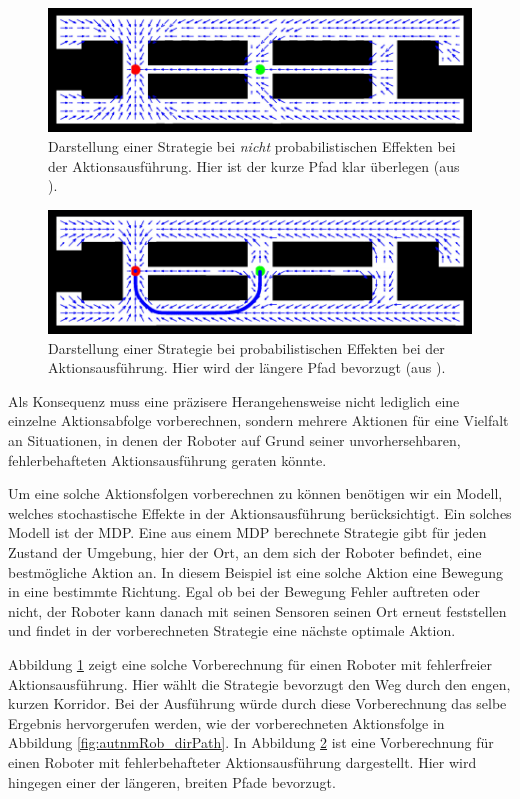 \documentclass[a4paper]{IEEEtran}
\begin{document}
\begin{figure}[ht]
	\centering
	\includegraphics[scale=0.72]{images/autnmRobot_detActionMDP.png}
	\caption{Darstellung einer Strategie bei \emph{nicht} probabilistischen Effekten bei der Aktionsausführung. Hier ist der kurze Pfad klar überlegen (aus \cite{thrun2005probabilistic}).}
	\label{autnmRobot_detA}
\end{figure}
\begin{figure}
	\includegraphics[scale=0.72]{images/autnmRobot_ndetActionMDP.png}
	\caption{Darstellung einer Strategie bei probabilistischen Effekten bei der Aktionsausführung. Hier wird der längere Pfad bevorzugt (aus \cite{thrun2005probabilistic}).}
	\label{autnmRobot_ndetA}
\end{figure}

Als Konsequenz muss eine präzisere Herangehensweise nicht lediglich eine einzelne Aktionsabfolge vorberechnen, sondern mehrere Aktionen für eine Vielfalt an Situationen, in denen der Roboter auf Grund seiner unvorhersehbaren, fehlerbehafteten Aktionsausführung geraten könnte.

Um eine solche Aktionsfolgen vorberechnen zu können benötigen wir ein Modell, welches stochastische Effekte in der Aktionsausführung berücksichtigt. Ein solches Modell ist der MDP. Eine aus einem MDP berechnete Strategie gibt für jeden Zustand der Umgebung, hier der Ort, an dem sich der Roboter befindet, eine bestmögliche Aktion an. In diesem Beispiel ist eine solche Aktion eine Bewegung in eine bestimmte Richtung. Egal ob bei der Bewegung Fehler auftreten oder nicht, der Roboter kann danach mit seinen Sensoren seinen Ort erneut feststellen und findet in der vorberechneten Strategie eine nächste optimale Aktion.

Abbildung \ref{autnmRobot_detA} zeigt eine solche Vorberechnung für einen Roboter mit fehlerfreier Aktionsausführung. Hier wählt die Strategie bevorzugt den Weg durch den engen, kurzen Korridor. Bei der Ausführung würde durch diese Vorberechnung das selbe Ergebnis hervorgerufen werden, wie der vorberechneten Aktionsfolge in Abbildung \ref{fig:autnmRob_dirPath}. In Abbildung \ref{autnmRobot_ndetA} ist eine Vorberechnung für einen Roboter mit fehlerbehafteter Aktionsausführung dargestellt. Hier wird hingegen einer der längeren, breiten Pfade bevorzugt.
\end{document}
